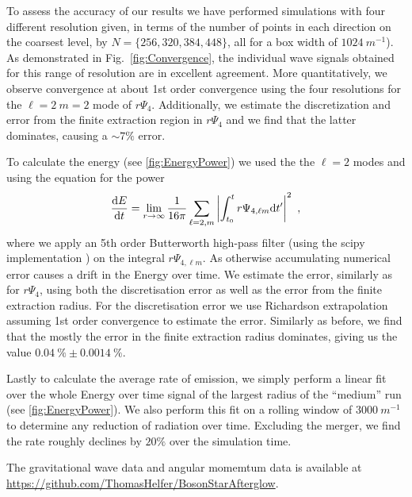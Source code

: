 \documentclass[aps,twocolumn,nofootinbib,superscriptaddress,amsfonts,floatfix
]{revtex4-1} %
\begin{document}
To assess the accuracy of our results we have performed simulations with four different resolution given, in terms of the number of points in each direction on the coarsest level, by $N = \{256,320,384,448\}$, all for a box width 
of $1024~m^{-1}$). As demonstrated in Fig.~\ref{fig:Convergence}, the individual wave signals obtained for this range of resolution are
in excellent agreement.
More quantitatively, we observe convergence at about 1st order convergence using the four resolutions for the $\ell = 2~m=2$ mode of $r\Psi_4$. Additionally, we estimate the discretization and error from the finite extraction region in $r\Psi_4$ and we find that the latter dominates, causing a $\sim 7\%$ error. 


To calculate the energy (see \cref{fig:EnergyPower}) we used the the $\ell = 2 $ modes and using the equation for the power
\begin{equation}\label{eq:GWpower}
    \frac{{\rm d}E}{{\rm d}t} = \lim_{r\rightarrow \infty} \frac{1}{16 \pi} \sum_{\ell = 2, m} \left|\int_{t_0}^{t}  r\Psi_{4,\ell m}{\rm d}t^\prime \right|^2~,
\end{equation}
where we apply an 5th order Butterworth high-pass filter (using the scipy implementation \cite{jones_scipy_2001}) on the integral $r\Psi_{4,\ell m}$. As otherwise accumulating numerical error causes a  drift in the Energy over time. 
We estimate the error, similarly as for $r\Psi_4$, using both the discretisation error as well as the error from the finite extraction radius. For the discretisation error we use Richardson extrapolation assuming 1st order convergence to estimate the error. Similarly as before, we find that the mostly the error in the finite extraction radius dominates, giving us the value $ 0.04~\% \pm 0.0014~\% $. 

Lastly to calculate the average rate of emission, we simply perform a linear fit over the whole Energy over time signal of the largest radius of the ``medium'' run (see \cref{fig:EnergyPower}). We also perform this fit on a rolling window of $3000~m^{-1}$ to determine any reduction of radiation over time. Excluding the merger, we find the rate roughly declines by $20 \%$ over the simulation time. 

 The gravitational wave data and angular momemtum data is available at \url{https://github.com/ThomasHelfer/BosonStarAfterglow}.
\end{document}
